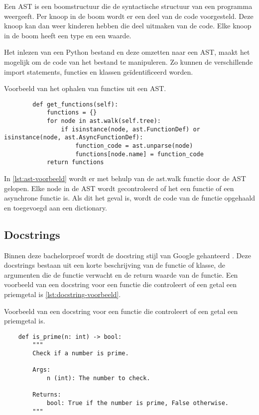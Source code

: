 Een AST is een boomstructuur die de syntactische structuur van een programma weergeeft.
Per knoop in de boom wordt er een deel van de code voorgesteld. 
Deze knoop kan dan weer kinderen hebben die deel uitmaken van de code.
Elke knoop in de boom heeft een type en een waarde.

Het inlezen van een Python bestand en deze omzetten naar een AST, maakt het mogelijk om de code van het bestand te manipuleren.
Zo kunnen de verschillende import statements, functies en klassen geïdentificeerd worden.

\begin{listing}
    \caption[Ophalen functies uit AST]{Voorbeeld van het ophalen van functies uit een AST.}
    \label{lst:ast-voorbeeld}
    \begin{verbatim}
        def get_functions(self):
            functions = {}
            for node in ast.walk(self.tree):
                if isinstance(node, ast.FunctionDef) or isinstance(node, ast.AsyncFunctionDef):
                    function_code = ast.unparse(node)
                    functions[node.name] = function_code
            return functions
    \end{verbatim}
\end{listing}

In \ref{lst:ast-voorbeeld} wordt er met behulp van de ast.walk functie door de AST gelopen.
Elke node in de AST wordt gecontroleerd of het een functie of een asynchrone functie is.
Als dit het geval is, wordt de code van de functie opgehaald en toegevoegd aan een dictionary.

\subsection{Docstrings}
\label{sec:bestanddocumentatie-docstrings}
Binnen deze bachelorproef wordt de docstring stijl van Google gehanteerd \autocite{GPT2024}.
Deze docstrings bestaan uit een korte beschrijving van de functie of klasse, de argumenten die de functie verwacht en de return waarde van de functie.
Een voorbeeld van een docstring voor een functie die controleert of een getal een priemgetal is \ref{lst:docstring-voorbeeld}.

\begin{listing}
    \caption[Docstring van een functie]{Voorbeeld van een docstring voor een functie die controleert of een getal een priemgetal is.}
    \label{lst:docstring-voorbeeld}
    \begin{verbatim}
    def is_prime(n: int) -> bool:
        """
        Check if a number is prime.

        Args:
            n (int): The number to check.

        Returns:
            bool: True if the number is prime, False otherwise.
        """
    \end{verbatim}
\end{listing}


